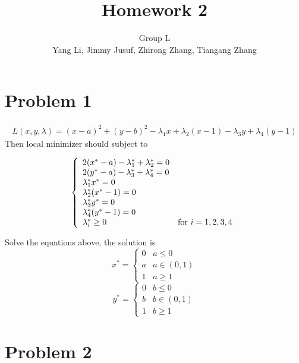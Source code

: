 \documentclass{article}
\title{Homework 2}
\author{Group L\\
Yang Li, Jimmy Jusuf, Zhirong Zhang, Tiangang Zhang}
\begin{document}
\maketitle


\section{Problem 1}
\begin{eqnarray*}
L(x,y,\lambda)=(x-a)^2+(y-b)^2-\lambda_1 x+\lambda_2 (x-1)-\lambda_3 y +\lambda_4 (y-1)
\end{eqnarray*}
Then local minimizer should subject to

\begin{equation}  
\left\{  
             \begin{array}{ll}
             2(x^*-a)-\lambda_1^*+\lambda_2^*=0\\  
             2(y^*-a)-\lambda_3^*+\lambda_4^*=0\\
             \lambda_1^* x^*=0\\
             \lambda_2^*(x^*-1)=0\\
             \lambda_3^* y^*=0\\
             \lambda_4^*(y^*-1)=0\\
             \lambda_i^* \geq 0 & \textnormal{for~} i=1,2,3,4
             \end{array}  
\right.  
\end{equation}  

Solve the equations above, the solution is
\begin{equation}  
x^*=
\left\{  
             \begin{array}{ll}
             0 & a\leq 0\\
             a & a \in (0,1) \\
             1 & a \geq 1
             \end{array}  
\right.  
\end{equation} 
\begin{equation}  
y^*=
\left\{  
             \begin{array}{ll}
             0 & b\leq 0\\
             b & b \in (0,1) \\
             1 & b \geq 1
             \end{array}  
\right.  
\end{equation}  

\section{Problem 2}
\end{document}
